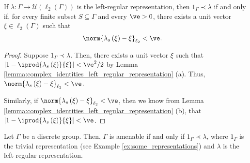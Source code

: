 \begin{lemma}\label{lemma:l2_unit_vector}
  If $\lambda\colon\Gamma\rightarrow \mathcal{U}\left( \ell_2\left( \Gamma \right) \right)$ is the left-regular representation, then $1_{\Gamma}\prec \lambda$ if and only if, for every finite subset $S\subseteq \Gamma$ and every $\ve > 0$, there exists a unit vector $\xi\in \ell_2\left( \Gamma \right)$ such that
  \begin{align*}
    \norm{\lambda_s\left( \xi \right) - \xi}_{\ell_2} &< \ve.
  \end{align*}
\end{lemma}
\begin{proof}
  Suppose $1_{\Gamma}\prec \lambda$. Then, there exists a unit vector $\xi$ such that $\left\vert 1 - \iprod{\lambda_s\left( \xi \right)}{\xi} \right\vert < \ve^2/2$ by Lemma \ref{lemma:complex_identities_left_regular_representation} (a). Thus, $\norm{\lambda_s\left( \xi \right) - \xi}_{\ell_2} < \ve$.\newline

  Similarly, if $\norm{\lambda_s\left( \xi \right) - \xi}_{\ell_2} < \ve$, then we know from Lemma \ref{lemma:complex_identities_left_regular_representation} (b), that $ \left\vert 1 - \iprod{\lambda_s\left( \xi \right)}{\xi} \right\vert < \ve $.
\end{proof}
\begin{theorem}
  Let $\Gamma$ be a discrete group. Then, $\Gamma$ is amenable if and only if $1_{\Gamma}\prec \lambda$, where $1_{\Gamma}$ is the trivial representation (see Example \ref{ex:some_representations}) and $\lambda$ is the left-regular representation.
\end{theorem}
